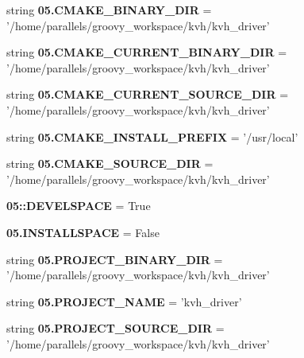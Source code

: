 \begin{DoxyCompactItemize}
\item 
string {\bf 05.\-C\-M\-A\-K\-E\-\_\-\-B\-I\-N\-A\-R\-Y\-\_\-\-D\-I\-R} = '/home/parallels/groovy\-\_\-workspace/kvh/kvh\-\_\-driver'
\item 
string {\bf 05.\-C\-M\-A\-K\-E\-\_\-\-C\-U\-R\-R\-E\-N\-T\-\_\-\-B\-I\-N\-A\-R\-Y\-\_\-\-D\-I\-R} = '/home/parallels/groovy\-\_\-workspace/kvh/kvh\-\_\-driver'
\item 
string {\bf 05.\-C\-M\-A\-K\-E\-\_\-\-C\-U\-R\-R\-E\-N\-T\-\_\-\-S\-O\-U\-R\-C\-E\-\_\-\-D\-I\-R} = '/home/parallels/groovy\-\_\-workspace/kvh/kvh\-\_\-driver'
\item 
string {\bf 05.\-C\-M\-A\-K\-E\-\_\-\-I\-N\-S\-T\-A\-L\-L\-\_\-\-P\-R\-E\-F\-I\-X} = '/usr/local'
\item 
string {\bf 05.\-C\-M\-A\-K\-E\-\_\-\-S\-O\-U\-R\-C\-E\-\_\-\-D\-I\-R} = '/home/parallels/groovy\-\_\-workspace/kvh/kvh\-\_\-driver'
\item 
{\bf 05\-::\-D\-E\-V\-E\-L\-S\-P\-A\-C\-E} = \-True
\item 
{\bf 05.\-I\-N\-S\-T\-A\-L\-L\-S\-P\-A\-C\-E} = \-False
\item 
string {\bf 05.\-P\-R\-O\-J\-E\-C\-T\-\_\-\-B\-I\-N\-A\-R\-Y\-\_\-\-D\-I\-R} = '/home/parallels/groovy\-\_\-workspace/kvh/kvh\-\_\-driver'
\item 
string {\bf 05.\-P\-R\-O\-J\-E\-C\-T\-\_\-\-N\-A\-M\-E} = 'kvh\-\_\-driver'
\item 
string {\bf 05.\-P\-R\-O\-J\-E\-C\-T\-\_\-\-S\-O\-U\-R\-C\-E\-\_\-\-D\-I\-R} = '/home/parallels/groovy\-\_\-workspace/kvh/kvh\-\_\-driver'
\end{DoxyCompactItemize}
